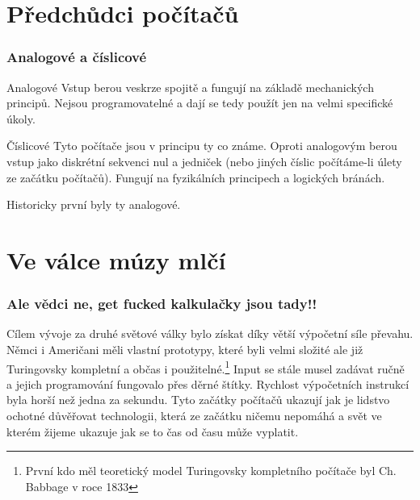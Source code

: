 \documentclass{beamer}
\begin{document}
\section{Předchůdci počítačů}
\label{sec:fde-cycle}

\begin{frame}
 \frametitle{Analogové a číslicové}
 \begin{block}{Analogové}
  Vstup berou veskrze spojitě a fungují na základě mechanických principů. Nejsou
  programovatelné a dají se tedy použít jen na velmi specifické úkoly.
 \end{block}

 \begin{block}{Číslicové}
  Tyto počítače jsou v principu ty co známe. Oproti analogovým berou vstup jako
  diskrétní sekvenci nul a jedniček (nebo jiných číslic počítáme-li úlety ze
  začátku počítačů). Fungují na fyzikálních principech a logických bránách.
  
 \end{block}

Historicky první byly ty analogové.
 \end{frame}



\section{Ve válce múzy mlčí}
\begin{frame}
 \frametitle{Ale vědci ne, get fucked kalkulačky jsou tady!!}
Cílem vývoje za druhé světové války bylo získat díky větší výpočetní síle
převahu. Němci i Američani měli vlastní prototypy, které byli velmi složité ale
již Turingovsky kompletní a občas i použitelné.\footnote{První kdo měl
teoretický model Turingovsky kompletního počítače byl Ch. Babbage v roce 1833}
\vfill
Input se stále musel zadávat ručně a jejich programování fungovalo přes děrné
štítky. Rychlost výpočetních instrukcí byla horší než jedna za sekundu.
\vfill
Tyto začátky počítačů ukazují jak je lidstvo ochotné důvěřovat technologii,
která ze začátku ničemu nepomáhá a svět ve kterém žijeme ukazuje jak se to čas
od času může vyplatit.
\end{frame}
\end{document}
